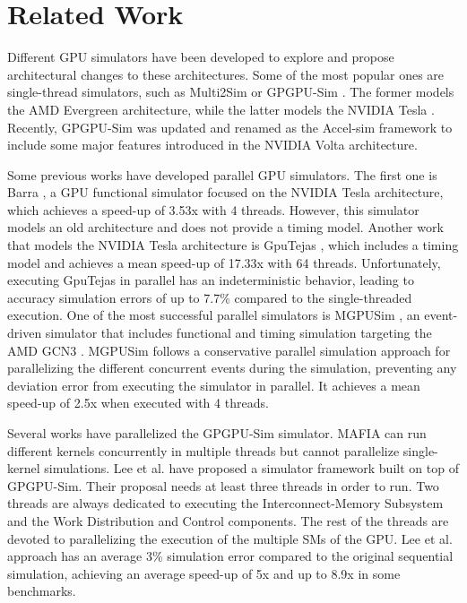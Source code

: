 \section{Related Work}
\label{sec:relatedwork}

\par
Different GPU simulators have been developed to explore and propose architectural changes to these architectures. Some of the most popular ones are single-thread simulators, such as Multi2Sim \cite{multi2sim} or GPGPU-Sim \cite{gpgpusimOriginal}. The former models the AMD Evergreen \cite{amdevergreen} architecture, while the latter models the NVIDIA Tesla \cite{teslaHotchips}. Recently, GPGPU-Sim was updated and renamed as the Accel-sim framework \cite{accelsim} to include some major features introduced in the NVIDIA Volta \cite{voltaPaper} architecture.

\par
Some previous works have developed parallel GPU simulators. The first one is Barra \cite{barra}, a GPU functional simulator focused on the NVIDIA Tesla architecture, which achieves a speed-up of 3.53x with 4 threads. However, this simulator models an old architecture and does not provide a timing model. Another work that models the NVIDIA Tesla architecture is GpuTejas \cite{gputejas}, which includes a timing model and achieves a mean speed-up of 17.33x with 64 threads. Unfortunately, executing GpuTejas in parallel has an indeterministic behavior, leading to accuracy simulation errors of up to 7.7\% compared to the single-threaded execution. One of the most successful parallel simulators is MGPUSim \cite{mgpusim}, an event-driven simulator that includes functional and timing simulation targeting the AMD GCN3 \cite{amdgcn3}. MGPUSim follows a conservative parallel simulation approach for parallelizing the different concurrent events during the simulation, preventing any deviation error from executing the simulator in parallel. It achieves a mean speed-up of 2.5x when executed with 4 threads.

\par
Several works have parallelized the GPGPU-Sim simulator. MAFIA \cite{mafia} can run different kernels concurrently in multiple threads but cannot parallelize single-kernel simulations. Lee et al. \cite{parallelGPUSim1} \cite{parallelGPUSim2} have proposed a simulator framework built on top of GPGPU-Sim. Their proposal needs at least three threads in order to run. Two threads are always dedicated to executing the Interconnect-Memory Subsystem and the Work Distribution and Control components. The rest of the threads are devoted to parallelizing the execution of the multiple SMs of the GPU. Lee et al. approach has an average 3\% simulation error compared to the original sequential simulation, achieving an average speed-up of 5x and up to 8.9x in some benchmarks.

